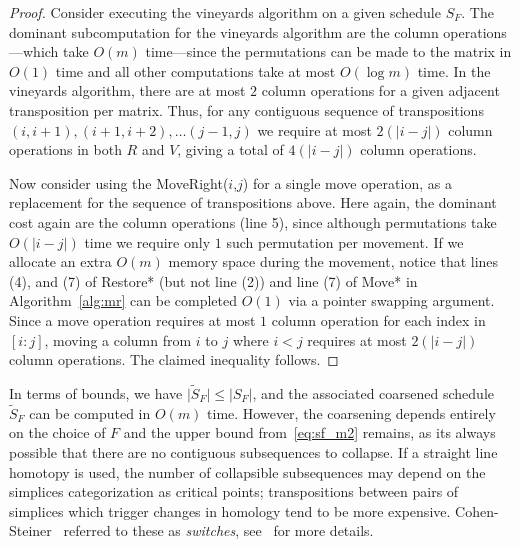 \documentclass{article} %
\newtheorem{proof}{Proof}
\begin{document}
\begin{proof}
Consider executing the vineyards algorithm on a given schedule $S_F$.
	The dominant subcomputation for the vineyards algorithm are the column operations---which take $O(m)$ time---since the permutations can be made to the matrix in $O(1)$ time and all other computations take at most $O(\log m)$ time. In the vineyards algorithm, there are at most $2$ column operations for a given adjacent transposition per matrix. 
	Thus, for any contiguous sequence of transpositions $(i,i+1), (i+1,i+2), \ldots (j-1,j)$ we require at most $2(\lvert i - j \rvert)$ column operations in both $R$ and $V$, giving a total of $4(\lvert i - j \rvert)$ column operations.
	
	Now consider using the MoveRight($i$,$j$) for a single move operation, as a replacement for the sequence of transpositions above. Here again, the dominant cost again are the column operations (line 5), since although permutations take $O(\lvert i - j\rvert)$ time we require only $1$ such permutation per movement. 
	If we allocate an extra $O(m)$ memory space during the movement, notice that lines (4), and (7) of Restore* (but not line (2)) and line (7) of Move* in Algorithm~\ref{alg:mr} can be completed $O(1)$ via a pointer swapping argument. 
	Since a move operation requires at most $1$ column operation for each index in $[i: j]$, moving a column from $i$ to $j$ where $i < j$ requires at most $2(\lvert i - j \rvert)$ column operations. The claimed inequality follows. 
\end{proof}
In terms of bounds, we have $\lvert \widetilde{S}_F \rvert \leq \lvert S_F \rvert$, and the associated coarsened schedule $\widetilde{S}_F$ can be computed in $O(m)$ time. 
However, the coarsening depends entirely on the choice of $F$ and the upper bound from~\ref{eq:sf_m2} remains, as its always possible that there are no contiguous subsequences to collapse. If a straight line homotopy is used, the number of collapsible subsequences may depend on the simplices categorization as critical points; transpositions between pairs of simplices which trigger  changes in homology tend to be more expensive. Cohen-Steiner~\cite{cohen2006vines} referred to these as \emph{switches}, see~\cite{edelsbrunner2000topological} for more details. 
\end{document}
